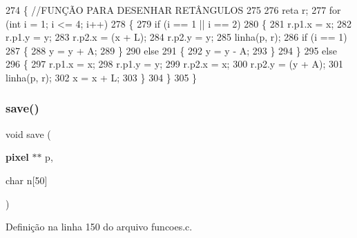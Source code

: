 \begin{DoxyCode}
274 \{ \textcolor{comment}{//FUNÇÃO PARA DESENHAR RETÂNGULOS}
275 
276     reta r;
277     \textcolor{keywordflow}{for} (\textcolor{keywordtype}{int} i = 1; i <= 4; i++)
278     \{
279         \textcolor{keywordflow}{if} (i == 1 || i == 2)
280         \{
281             r.p1.x = x;
282             r.p1.y = y;
283             r.p2.x = (x + L);
284             r.p2.y = y;
285             linha(p, r);
286             \textcolor{keywordflow}{if} (i == 1)
287             \{
288                 y = y + A;
289             \}
290             \textcolor{keywordflow}{else}
291             \{
292                 y = y - A;
293             \}
294         \}
295         \textcolor{keywordflow}{else}
296         \{
297             r.p1.x = x;
298             r.p1.y = y;
299             r.p2.x = x;
300             r.p2.y = (y + A);
301             linha(p, r);
302             x = x + L;
303         \}
304     \}
305 \}
\end{DoxyCode}
\mbox{\label{funcoes_8c_aac06a97a8a9d94b58eb0925039019f33}} 
\subsubsection{save()}
{\footnotesize\ttfamily void save (\begin{DoxyParamCaption}\item[{\textbf{ pixel} $\ast$$\ast$}]{p,  }\item[{char}]{n[50] }\end{DoxyParamCaption})}



Definição na linha 150 do arquivo funcoes.\+c.




